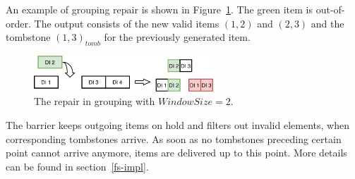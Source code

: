 An example of grouping repair is shown in Figure~\ref{grouping-replaying}. The green item is out-of-order. The output consists of the new valid items  $(1, 2)$ and $(2, 3)$  and the tombstone $(1, 3)_{tomb}$ for the previously generated item.

\begin{figure}[t]
  \centering
  \includegraphics[width=0.6\textwidth]{Chapters/DeterministicModelRuntime/pics/grouping-replaying}
  \caption{The repair in grouping with $WindowSize = 2$.}
  \label {grouping-replaying}
\end{figure}

The barrier  keeps outgoing items on hold and filters out invalid elements, when corresponding tombstones arrive. As soon as no tombstones preceding certain point cannot arrive anymore, items are delivered  up to this point. More details can be found  in section~\ref{fs-impl}.

